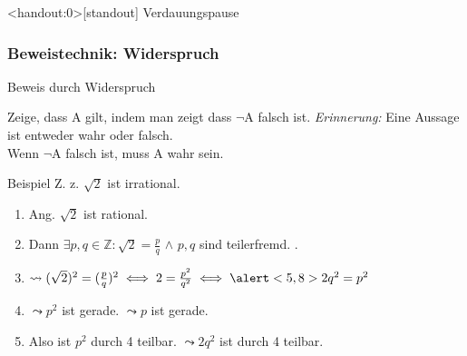 \begin{frame}<handout:0>[standout]
    Verdauungspause
\end{frame}

\subsubsection{Beweistechnik: Widerspruch}
\begin{frame}[fragile]{Beweis durch Widerspruch}
\small{
    \begin{alertblock}{Zeige, dass A gilt, indem man zeigt dass $\neg$A falsch ist.}
    \emph{Erinnerung:} Eine Aussage ist entweder wahr oder falsch.\\
    Wenn $\neg$A falsch ist, muss A wahr sein.
    \end{alertblock}
    \begin{exampleblock}{Beispiel}
        Z. z. $\sqrt{2}$ ist irrational.
        \begin{enumerate}
            \item<1-|handout:1> \alert<1>{Ang. $\sqrt{2}$ ist rational.}
            \item<2-|handout:1> \alert<2>{Dann $\exists p, q \in \mathbb{Z} : \sqrt{2} = \frac{p}{q}$} $\wedge$ \alert<3,11>{$p, q$ sind teilerfremd.}
            .
            \item<4-|handout:1> $\leadsto(\sqrt{2})^2 = (\frac{p}{q})^2 \iff 2 = \frac{p^2}{q^2} \iff \alert<5,8>{2q^2=p^2}$
            \item<5-|handout:1> \alert<5>{$\leadsto p^2$ ist gerade.} \alert<6,10>{$\leadsto p$ ist gerade.}
            \item<7-|handout:2> \alert<7>{Also ist $p^2$ durch 4 teilbar.} \alert<8>{$\leadsto 2q^2$ ist durch 4 teilbar.}

\end{enumerate}
\end{exampleblock}}
\end{frame}
